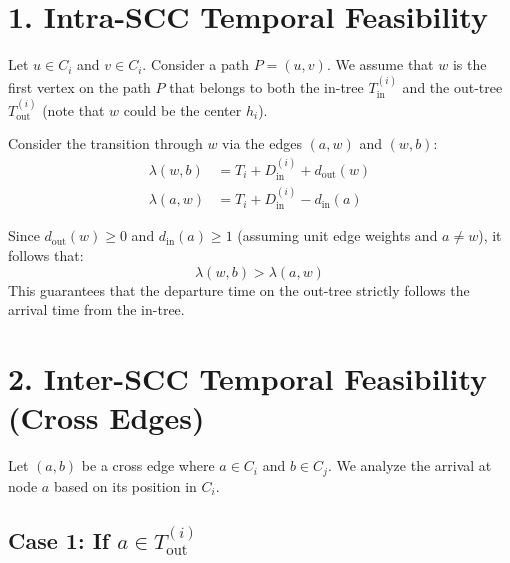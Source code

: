 \documentclass[11pt]{article}
\begin{document}
\section*{1. Intra-SCC Temporal Feasibility}

Let $u \in C_i$ and $v \in C_i$. Consider a path $P = (u,v)$. We assume that $w$ is the first vertex on the path $P$ that belongs to both the in-tree $T_{\mathrm{in}}^{(i)}$ and the out-tree $T_{\mathrm{out}}^{(i)}$ (note that $w$ could be the center $h_i$).

Consider the transition through $w$ via the edges $(a,w)$ and $(w,b)$:
\begin{align*}
    \lambda(w,b) &= T_i + D_{\mathrm{in}}^{(i)} + d_{\mathrm{out}}(w) \\
    \lambda(a,w) &= T_i + D_{\mathrm{in}}^{(i)} - d_{\mathrm{in}}(a)
\end{align*}

Since $d_{\mathrm{out}}(w) \ge 0$ and $d_{\mathrm{in}}(a) \ge 1$ (assuming unit edge weights and $a \neq w$), it follows that:
\[
    \lambda(w,b) > \lambda(a,w)
\]
This guarantees that the departure time on the out-tree strictly follows the arrival time from the in-tree.

\vspace{1em}
\begin{center}
\end{center}

\vspace{2em}

\section*{2. Inter-SCC Temporal Feasibility (Cross Edges)}

Let $(a,b)$ be a cross edge where $a \in C_i$ and $b \in C_j$. We analyze the arrival at node $a$ based on its position in $C_i$.

\subsection*{Case 1: If $a \in T_{\mathrm{out}}^{(i)}$}
\end{document}
